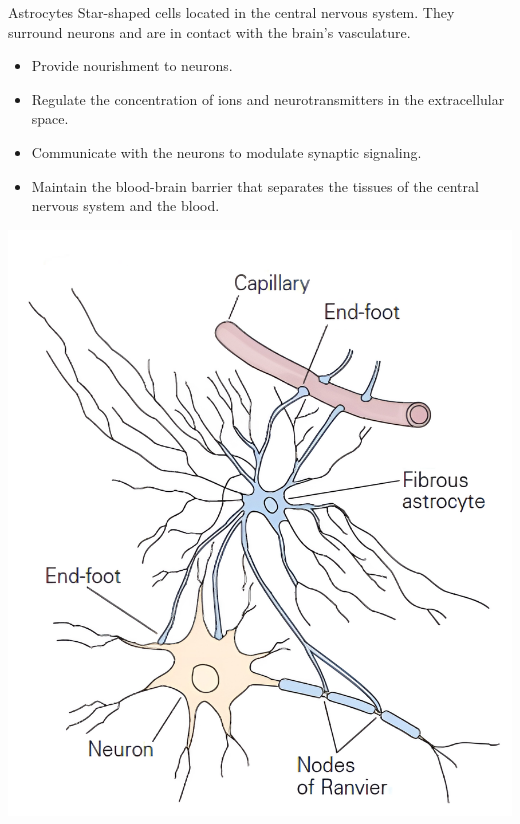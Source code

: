 \begin{minipage}{0.79\textwidth}
    \begin{descriptionlist}
        \item[Astrocytes] 
            Star-shaped cells located in the central nervous system.
            They surround neurons and are in contact with the brain's vasculature.
            \begin{itemize}
                \item Provide nourishment to neurons.
                \item Regulate the concentration of ions and neurotransmitters in the extracellular space.
                \item Communicate with the neurons to modulate synaptic signaling.
                \item Maintain the blood-brain barrier that separates the tissues of the central nervous system and the blood.
            \end{itemize}
    \end{descriptionlist}
\end{minipage}
\begin{minipage}{0.2\textwidth}
    \centering
    \includegraphics[width=\textwidth]{./img/astrocyte.png}
\end{minipage}\\[1em]


